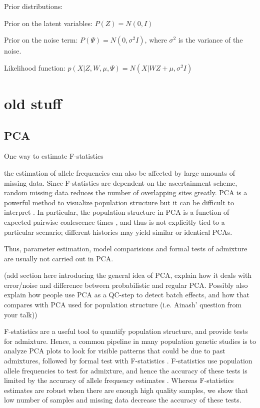 \documentclass[12pt, letterpaper]{article}
\begin{document}
Prior distributions:

Prior on the latent variables: $P(Z) = N(0, I)$

Prior on the noise term: $P(\Psi) = N(0, \sigma^2I)$, where $\sigma^2$ is the variance of the noise.

Likelihood function:
$p(X|Z, W, \mu, \Psi) = N(X|WZ + \mu, \sigma^2I)$

\section{old stuff}
\subsection{PCA}

One way to estimate F-statistics 

the estimation of allele frequencies can also be affected by large amounts of missing data. Since F-statistics are dependent on the ascertainment scheme, random missing data reduces the number of overlapping sites greatly.
PCA is a powerful method to visualize population structure but it can be difficult to interpret \citep{cavalli-sforza1993, novembre_stephens_2008, degiorgio_rosenberg2013}. In particular, the population structure in PCA is a function of expected pairwise coalescence times \citep{mcvean_genealogical_2009}, and thus is not explicitly tied to a particular scenario; different histories may yield similar or identical PCAs. 

Thus, parameter estimation, model comparisions and formal tests of admixture are usually not carried out in PCA. 

(add section here introducing the general idea of PCA, explain how it deals with error/noise  and difference between probabilistic and regular PCA. Possibly also explain how people use PCA as a QC-step to detect batch effects, and how that compares with PCA used for population structure (i.e. Ainash' question from your talk))

F-statistics are a useful tool to quantify population structure, and provide tests for admixture. Hence, a common pipeline in many population genetic studies is to analyze PCA plots to look for visible patterns that could be due to past admixtures, followed by formal test with F-statistics \cite{lazaridis_ancient_2014,lazaridis_genomic_2016}. F-statistics use population allele frequencies to test for admixture, and hence the accuracy of these tests is limited by the accuracy of allele frequency estimates \cite{peter_admixture_2016}. Whereas F-statistics estimates are robust when there are enough high quality samples, we show that low number of samples and missing data decrease the accuracy of these tests.
\end{document}
